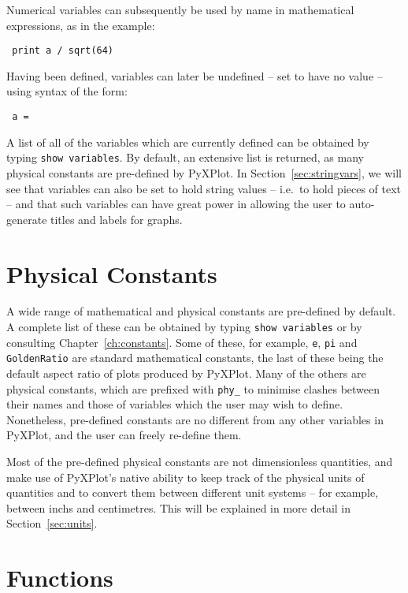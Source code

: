\noindent Numerical variables can subsequently be used by name in mathematical
expressions, as in the example:

\begin{verbatim} print a / sqrt(64) \end{verbatim}

\noindent Having been defined, variables can later be undefined -- set to have
no value -- using syntax of the form:

\begin{verbatim} a = \end{verbatim}

A list of all of the variables which are currently defined can be obtained by
typing {\tt show variables}. By default, an extensive
list is returned, as many physical constants are pre-defined by PyXPlot. In
Section~\ref{sec:stringvars}, we will see that variables can also be set to
hold string values -- i.e.\ to hold pieces of text -- and that such variables
can have great power in allowing the user to auto-generate titles and labels
for graphs.

\section{Physical Constants} \label{sec:constants} 

A wide range of mathematical and physical constants are pre-defined by default.
A complete list of these can be obtained by typing {\tt show variables} or by
consulting Chapter~\ref{ch:constants}. Some of these, for example, {\tt e},
{\tt pi} and {\tt GoldenRatio} are standard mathematical constants, the last of
these being the default aspect ratio of plots produced by PyXPlot. Many of the
others are physical constants, which are prefixed with {\tt phy\_} to minimise
clashes between their names and those of variables which the user may wish to
define.  Nonetheless, pre-defined constants are no different from any other
variables in PyXPlot, and the user can freely re-define them.

Most of the pre-defined physical constants are not dimensionless quantities,
and make use of PyXPlot's native ability to keep track of the physical units of
quantities and to convert them between different unit systems -- for example,
between inchs and centimetres.  This will be explained in more detail in
Section~\ref{sec:units}.

\section{Functions} \label{sec:functions}

